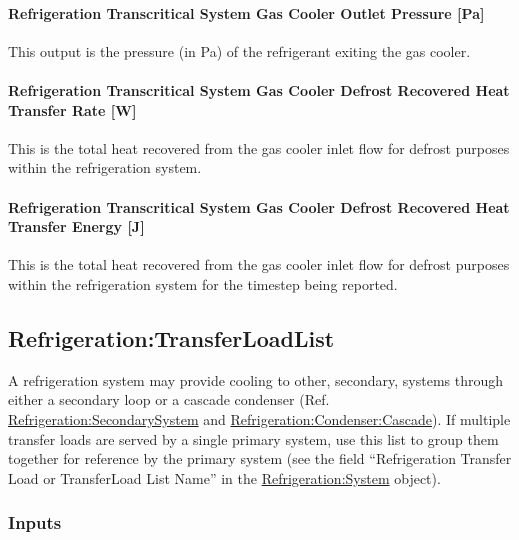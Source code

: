 \paragraph{Refrigeration Transcritical System Gas Cooler Outlet Pressure {[}Pa{]}}\label{refrigeration-transcritical-system-gas-cooler-outlet-pressure-pa}

This output is the pressure (in Pa) of the refrigerant exiting the gas cooler.

\paragraph{Refrigeration Transcritical System Gas Cooler Defrost Recovered Heat Transfer Rate {[}W{]}}\label{refrigeration-transcritical-system-gas-cooler-defrost-recovered-heat-transfer-rate-w}

This is the total heat recovered from the gas cooler inlet flow for defrost purposes within the refrigeration system.

\paragraph{Refrigeration Transcritical System Gas Cooler Defrost Recovered Heat Transfer Energy {[}J{]}}\label{refrigeration-transcritical-system-gas-cooler-defrost-recovered-heat-transfer-energy-j}

This is the total heat recovered from the gas cooler inlet flow for defrost purposes within the refrigeration system for the timestep being reported.

\subsection{Refrigeration:TransferLoadList}\label{refrigerationtransferloadlist}

A refrigeration system may provide cooling to other, secondary, systems through either a secondary loop or a cascade condenser (Ref. \hyperref[refrigerationsecondarysystem]{Refrigeration:SecondarySystem} and \hyperref[refrigerationcondensercascade]{Refrigeration:Condenser:Cascade}). If multiple transfer loads are served by a single primary system, use this list to group them together for reference by the primary system (see the field ``Refrigeration Transfer Load or TransferLoad List Name'' in the \hyperref[refrigerationsystem]{Refrigeration:System} object).

\subsubsection{Inputs}\label{inputs-13-011}

